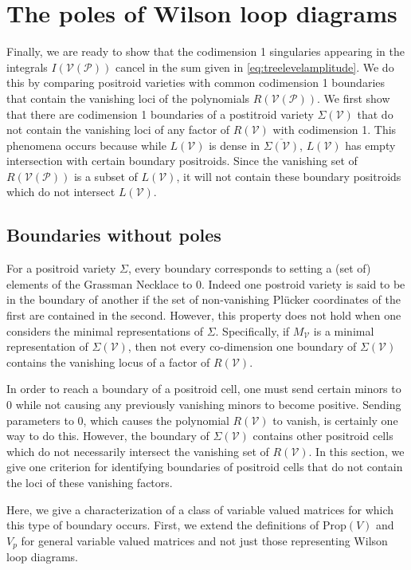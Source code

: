 \documentclass[11pt]{article}
\newcommand{\cP}{\mathcal{P}}
\newcommand{\cV}{\mathcal{V}}
\newcommand{\VP}{\cV(\cP)}
\newcommand{\Prop}{\textrm{Prop}}
\theoremstyle{remark}
\theoremstyle{definition}
\begin{document}
\section{The poles of Wilson loop diagrams \label{sec:poles}}

Finally, we are ready to show that the codimension 1 singularies appearing in the integrals $I(\VP)$ cancel in the sum given in \eqref{eq:treelevelamplitude}. We do this by comparing positroid varieties with common codimension 1 boundaries that contain the vanishing loci of the polynomials $R(\VP)$. We first show that there are codimension 1 boundaries of a postitroid variety $\Sigma(\cV)$ that do not contain the vanishing loci of any factor of $R(\cV)$ with codimension 1. This phenomena occurs because while $L(\cV)$ is dense in $\overline{\Sigma(\cV)}$, $L(\cV)$ has empty intersection with certain boundary positroids. Since the vanishing set of $R(\VP)$ is a subset of $L(\cV)$, it will not contain these boundary positroids which do not intersect $L(\cV)$.

\subsection{Boundaries without poles \label{sec:boundarysanspoles}}

For a positroid variety $\Sigma$, every boundary corresponds to setting a (set of) elements of the Grassman Necklace to 0. Indeed one postroid variety is said to be in the boundary of another if the set of non-vanishing Pl{\"u}cker coordinates of the first are contained in the second. However, this property does not hold when one considers the minimal representations of $\Sigma$. Specifically, if $M_\cV$ is a minimal representation of $\Sigma(\cV)$, then not every co-dimension one boundary of $\Sigma(\cV)$ contains the vanishing locus of a factor of $R(\cV)$.

In order to reach a boundary of a positroid cell, one must send certain minors to 0 while not causing any previously vanishing minors to become positive. Sending parameters to $0$, which causes the polynomial $R(\cV)$ to vanish, is certainly one way to do this. However, the boundary of $\Sigma(\cV)$ contains other positroid cells which do not necessarily intersect the vanishing set of $R(\cV)$. In this section, we give one criterion for identifying boundaries of positroid cells that do not contain the loci of these vanishing factors. 

Here, we give a characterization of a class of variable valued matrices for which this type of boundary occurs. First, we extend the definitions of $\Prop(V)$ and $V_p$ for general variable valued matrices and not just those representing Wilson loop diagrams.
\end{document}
